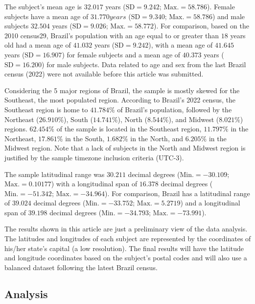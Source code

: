 \documentclass[
  12pt,
  a4paper,
  oneside]{tesesusp}
\begin{document}
The subject's mean age is \(32.017\) years (\(\text{SD} = 9.242\);
\(\text{Max.} = 58.786\)). Female subjects have a mean age of
\(31.770 years\) (\(\text{SD} = 9.340\); \(\text{Max.} = 58.786\)) and
male subjects \(32.504\) years (\(\text{SD} = 9.026\);
\(\text{Max.} = 58.772\)). For comparison, based on the 2010 census29,
Brazil's population with an age equal to or greater than \(18\) years
old had a mean age of \(41.032\) years (\(\text{SD} = 9.242\)), with a
mean age of \(41.645\) years (\(\text{SD} = 16.907\)) for female
subjects and a mean age of \(40.373\) years (\(\text{SD} = 16.200\)) for
male subjects. Data related to age and sex from the last Brazil census
(2022) were not available before this article was submitted.

Considering the 5 major regions of Brazil, the sample is mostly skewed
for the Southeast, the most populated region. According to Brazil's 2022
census, the Southeast region is home to \(41.784\%\) of Brazil's
population, followed by the Northeast (\(26.910\%\)), South
(\(14.741\%\)), North (\(8.544\%\)), and Midwest (\(8.021\%\)) regions.
\(62.454\%\) of the sample is located in the Southeast region,
\(11.797\%\) in the Northeast, \(17.861\%\) in the South, \(1.682\%\) in
the North, and \(6.205\%\) in the Midwest region. Note that a lack of
subjects in the North and Midwest region is justified by the sample
timezone inclusion criteria (UTC-3).

The sample latitudinal range was \(30.211\) decimal degrees
(\(\text{Min.} = -30.109\); \(\text{Max.} = 0.10177\)) with a
longitudinal span of \(16.378\) decimal degrees
(\(\text{Min.} = -51.342\); \(\text{Max.} = -34.964\)). For comparison,
Brazil has a latitudinal range of \(39.024\) decimal degrees
(\(\text{Min.} = -33.752\); \(\text{Max.} = 5.2719\)) and a longitudinal
span of \(39.198\) decimal degrees (\(\text{Min.} = -34.793\);
\(\text{Max.} = -73.991\)).

The results shown in this article are just a preliminary view of the
data analysis. The latitudes and longitudes of each subject are
represented by the coordinates of his/her state's capital (a low
resolution). The final results will have the latitude and longitude
coordinates based on the subject's postal codes and will also use a
balanced dataset following the latest Brazil census.

\hypertarget{analysis}{%
\subsection{Analysis}\label{analysis}}
\end{document}
